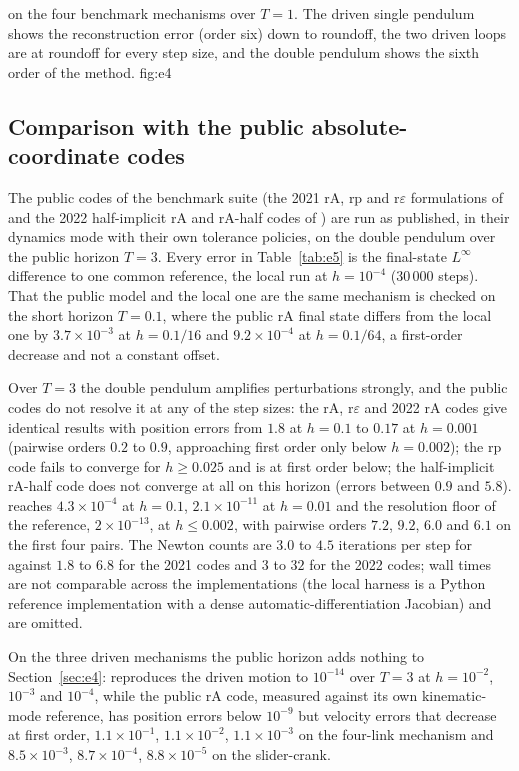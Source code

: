 {\method{} on the four benchmark mechanisms over $T=1$. The driven single pendulum shows the
reconstruction error (order six) down to roundoff, the two driven loops are at roundoff for every
step size, and the double pendulum shows the sixth order of the method.}
{fig:e4}

\subsection{Comparison with the public absolute-coordinate codes}
\label{sec:e5}

The public codes of the benchmark suite (the 2021 rA, rp and r$\varepsilon$ formulations of
\cite{kissel2022absolute} and the 2022 half-implicit rA and rA-half codes of
\cite{fang2023halfimplicit}) are run as published, in their dynamics mode with their own tolerance
policies, on the double pendulum over the public horizon $T=3$. Every error in
Table~\ref{tab:e5} is the final-state $L^\infty$ difference to one common reference, the local
\method{} run at $h=10^{-4}$ ($30\,000$ steps). That the public model and the local one are the same
mechanism is checked on the short horizon $T=0.1$, where the public rA final state differs from
the local one by $3.7\times10^{-3}$ at $h=0.1/16$ and $9.2\times10^{-4}$ at $h=0.1/64$, a
first-order decrease and not a constant offset.

Over $T=3$ the double pendulum amplifies perturbations strongly, and the public codes do not
resolve it at any of the step sizes: the rA, r$\varepsilon$ and 2022 rA codes give identical
results with position errors from $1.8$ at $h=0.1$ to $0.17$ at $h=0.001$ (pairwise orders
$0.2$ to $0.9$, approaching first order only below $h=0.002$); the rp code fails to converge for
$h\ge0.025$ and is at first order below; the half-implicit rA-half code does not converge at all
on this horizon (errors between $0.9$ and $5.8$). \method{} reaches $4.3\times10^{-4}$ at
$h=0.1$, $2.1\times10^{-11}$ at $h=0.01$ and the resolution floor of the reference,
$2\times10^{-13}$, at $h\le0.002$, with pairwise orders $7.2$, $9.2$, $6.0$ and $6.1$ on the first
four pairs. The Newton counts are $3.0$ to $4.5$ iterations per step for \method{} against $1.8$
to $6.8$ for the 2021 codes and $3$ to $32$ for the 2022 codes; wall times are not comparable
across the implementations (the local harness is a Python reference implementation with a dense
automatic-differentiation Jacobian) and are omitted.

On the three driven mechanisms the public horizon adds nothing to Section~\ref{sec:e4}:
\method{} reproduces the driven motion to $10^{-14}$ over $T=3$ at $h=10^{-2}$, $10^{-3}$ and
$10^{-4}$, while the public rA code, measured against its own kinematic-mode reference, has
position errors below $10^{-9}$ but velocity errors that decrease at first order,
$1.1\times10^{-1}$, $1.1\times10^{-2}$, $1.1\times10^{-3}$ on the four-link mechanism and
$8.5\times10^{-3}$, $8.7\times10^{-4}$, $8.8\times10^{-5}$ on the slider-crank.

